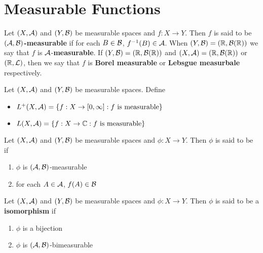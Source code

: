 \documentclass{book}
\begin{document}
	\newpage
	\section{Measurable Functions}
	
	\begin{defn}  
		Let $(X,\mathcal{A})$ and $(Y, \mathcal{B})$ be measurable spaces and $f:X \rightarrow Y$. Then $f$ is said to be \textbf{$(\mathcal{A},\mathcal{B})$-measurable} if for each $B \in \mathcal{B}$, $f^{-1}(B) \in \mathcal{A}$. When $(Y, \mathcal{B}) = (\mathbb{R}, \mathcal{B}(\mathbb{R}))$ we say that $f$ is $\mathcal{A}$-\textbf{measurable}. If $(Y,\mathcal{B}) = (\mathbb{R}, \mathcal{B}(\mathbb{R}))$ and $(X,\mathcal{A}) = (\mathbb{R}, \mathcal{B}(\mathbb{R}))$ or $(\mathbb{R}, \mathcal{L})$, then we say that $f$ is \textbf{Borel measurable} or \textbf{Lebsgue measurbale} respectively.
	\end{defn}
	
	\begin{defn}  
		Let $(X, \mathcal{A})$ and $(Y, \mathcal{B})$ be measurable spaces. Define 
		\begin{itemize}
			\item $L^{+}(X, \mathcal{A}) = \{f:X \rightarrow [0,\infty] : f \text{ is measurable}\}$
			\item $L(X, \mathcal{A}) = \{f:X \rightarrow \mathbb{C} : f \text{ is measurable}\}$ 
		\end{itemize}
	\end{defn}

	\begin{defn}  
		Let $(X, \mathcal{A})$ and $(Y, \mathcal{B})$ be measurable spaces and $\phi: X \rightarrow Y$. Then $\phi$ is said to be  if 
		\begin{enumerate}
			\item $\phi$ is $(\mathcal{A}, \mathcal{B})$-measurable
			\item for each $A \in \mathcal{A}$, $f(A) \in \mathcal{B}$
		\end{enumerate}
	\end{defn}
	
	\begin{defn} 
		Let $(X, \mathcal{A})$ and $(Y, \mathcal{B})$ be measurable spaces and $\phi: X \rightarrow Y$. Then $\phi$ is said to be a \textbf{isomorphism} if 
		\begin{enumerate}
			\item $\phi$ is a bijection
			\item $\phi$ is $(\mathcal{A}, \mathcal{B})$-bimeasurable
		\end{enumerate}
	\end{defn}
\end{document}
